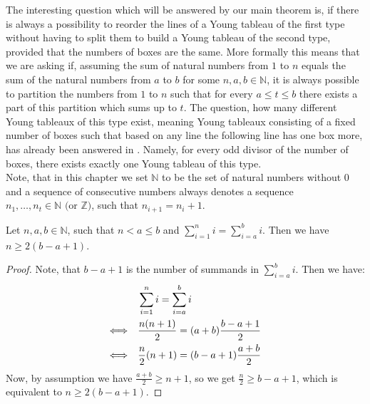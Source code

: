 The interesting question which will be answered by our main theorem is, if there is always a possibility to reorder the lines of a Young tableau of the first type without having to split them to build a Young tableau of the second type, provided that the numbers of boxes are the same. More formally this means that we are asking if, assuming the sum of natural numbers from \(1\) to \(n\) equals the sum of the natural numbers from \(a\) to \(b\) for some \(n,a,b\in\mathbb{N}\), it is always possible to partition the numbers from \(1\) to \(n\) such that for every \(a\leq t\leq b\) there exists a part of this partition which sums up to \(t\). The question, how many different Young tableaux of this type exist, meaning Young tableaux consisting of a fixed number of boxes such that based on any line the following line has one box more, has already been answered in \cite{5}. Namely, for every odd divisor of the number of boxes, there exists exactly one Young tableau of this type.\\
Note, that in this chapter we set \(\mathbb{N}\) to be the set of natural numbers without \(0\) and a sequence of consecutive numbers always denotes a sequence\\
\(n_1,\ldots,n_t\in\mathbb{N}\text{ (or }\mathbb{Z})\), such that \(n_{i+1}=n_i+1\).
\begin{lem}\label{lemma14}
Let \(n,a,b\in\mathbb{N}\), such that \(n<a\leq b\) and \(\sum\limits_{i=1}^ni=\sum\limits_{i=a}^bi\). Then we have\\
\(n\geq 2(b-a+1)\).
\begin{proof}
Note, that \(b-a+1\) is the number of summands in \(\sum\limits_{i=a}^bi\). Then we have:
\begin{align}
&\sum\limits_{i=1}^ni=\sum\limits_{i=a}^bi\notag\\
\Longleftrightarrow\quad &\frac{n(n+1)}{2}=(a+b)\frac{b-a+1}{2}\notag\\
\Longleftrightarrow\quad &\frac{n}{2}(n+1)=(b-a+1)\frac{a+b}{2}\notag
\end{align}
Now, by assumption we have \(\frac{a+b}{2}\geq n+1\), so we get \(\frac{n}{2}\geq b-a+1\), which is equivalent to \(n\geq 2(b-a+1)\).
\end{proof}
\end{lem}

